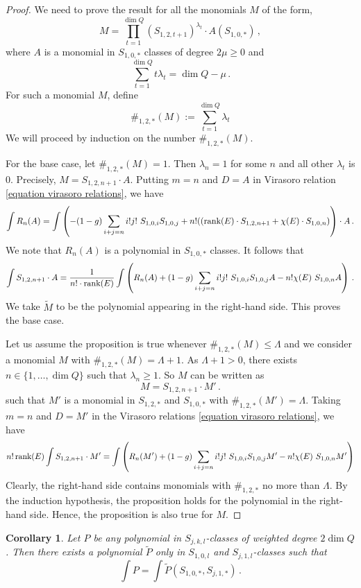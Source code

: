 \documentclass[11pt]{amsart}
\newtheorem{corollary}[theorem]{Corollary}
\theoremstyle{remark}
\newcommand{\rk}{\textnormal{rank}}
\newcommand{\wt}[1]{\widetilde{#1}}
\numberwithin{theorem}{section}
\begin{document}
\begin{proof}
    We need to prove the result for all the monomials $M$ of the form,
    $$M= \prod_{t=1}^{\dim Q} (S_{1,2,t+1})^{\lambda_t} \cdot A(S_{1,0,*})\,,$$
    where
    $A$ is a monomial in $S_{1,0,*}$ classes of degree $2\mu \geqslant 0$ and
    $$\sum_{t=1}^{\dim Q} t \lambda_t = \dim Q -\mu\,. $$
    For such a monomial $M$, define  
    $$\#_{1,2,*}(M) := \sum_{t=1}^{\dim Q} \lambda_t $$
    We will proceed by induction on the number $\#_{1,2,*}(M)$.
    
    For the base case, let $\#_{1,2,*}(M)=1$.
    Then $\lambda_n=1$ for some $n$ and all other $\lambda_t$ is 0.
    Precisely, $M = S_{1,2,n+1} \cdot A$.
    Putting $m=n$ and $D=A$ in Virasoro relation \eqref{equation virasoro relations}, we have
    $$\int R_n(A) = \int \left( -(1-g)\sum_{i+j=n}i!j!\ S_{1,0,i}S_{1,0,j} + n!(\left(\rk(E) \cdot S_{1,2,n+1} + \chi(E) \cdot S_{1,0,n} \right) \right)\cdot A \,.$$
    We note that $R_n(A)$ is a polynomial in $S_{1,0,*}$ classes.
    It follows that
    $$\int S_{1,2,n+1} \cdot A = \frac{1}{n! \cdot \rk(E)}
    \int \left( R_n(A) +
    (1-g)\sum_{i+j=n}i!j!\ S_{1,0,i}S_{1,0,j}A - n!\chi(E)\ S_{1,0,n} A \right) \,.
    $$
    We take $\wt M$ to be the polynomial appearing in the right-hand side.
    This proves the base case.
    
    Let us assume the proposition is true whenever $\#_{1,2,*}(M) \leqslant \Lambda$
    and we consider a monomial $M$ with $\#_{1,2,*}(M) =\Lambda+1$.
    As $\Lambda +1 >0$, there exists $n \in \{1,\dots,\dim Q\}$
    such that $\lambda_n \geqslant 1$.
    So $M$ can be written as 
    $$M = S_{1,2,n+1} \cdot M'\,.$$
    such that $M'$ is a monomial in $S_{1,2,*}$ and $S_{1,0,*}$
    with $\#_{1,2,*}(M') = \Lambda$.
    Taking $m=n$ and $D=M'$ in the Virasoro relations \eqref{equation virasoro relations}, we have
    $$n! \,\rk(E)\int S_{1,2,n+1} \cdot M' = \int \left( 
    R_n(M') + (1-g)\sum_{i+j=n}i!j!\ S_{1,0,i}S_{1,0,j}M' - n!\chi(E)\ S_{1,0,n} M' \right)
    $$
    Clearly, the right-hand side contains monomials with $\#_{1,2,*}$ no more than $\Lambda$.
    By the induction hypothesis, the proposition 
    holds for the polynomial in the right-hand side.
    Hence, the proposition is also true for $M$.
\end{proof}
\begin{corollary}\label{corollary intersection Sjkl from S10 and Sj1}
    Let $P$ be any polynomial in $S_{j,k,l}$-classes of weighted degree $2\dim Q$.
    Then there exists a polynomial $\wt P$ only in $S_{1,0,l}$ and $S_{j,1,l}$-classes such that 
    $$ \int P = \int \wt P (S_{1,0,*},S_{j,1,*})\,.$$
\end{corollary}
\end{document}
